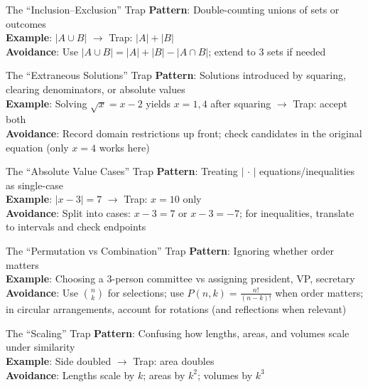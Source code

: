 \documentclass{article}
\begin{document}
\begin{trapbox}{The ``Inclusion--Exclusion'' Trap}
\textbf{Pattern}: Double-counting unions of sets or outcomes\\
\textbf{Example}: $|A\cup B|$ $\rightarrow$ Trap: $|A|+|B|$\\
\textbf{Avoidance}: Use $|A\cup B|=|A|+|B|-|A\cap B|$; extend to 3 sets if needed
\end{trapbox}

\begin{trapbox}{The ``Extraneous Solutions'' Trap}
\textbf{Pattern}: Solutions introduced by squaring, clearing denominators, or absolute values\\
\textbf{Example}: Solving $\sqrt{x}=x-2$ yields $x=1,4$ after squaring $\rightarrow$ Trap: accept both\\
\textbf{Avoidance}: Record domain restrictions up front; check candidates in the original equation (only $x=4$ works here)
\end{trapbox}

\begin{trapbox}{The ``Absolute Value Cases'' Trap}
\textbf{Pattern}: Treating $|\,\cdot\,|$ equations/inequalities as single-case\\
\textbf{Example}: $|x-3|=7$ $\rightarrow$ Trap: $x=10$ only\\
\textbf{Avoidance}: Split into cases: $x-3=7$ or $x-3=-7$; for inequalities, translate to intervals and check endpoints
\end{trapbox}

\begin{trapbox}{The ``Permutation vs Combination'' Trap}
\textbf{Pattern}: Ignoring whether order matters\\
\textbf{Example}: Choosing a 3-person committee vs assigning president, VP, secretary\\
\textbf{Avoidance}: Use $\binom{n}{k}$ for selections; use $P(n,k)=\frac{n!}{(n-k)!}$ when order matters; in circular arrangements, account for rotations (and reflections when relevant)
\end{trapbox}

\begin{trapbox}{The ``Scaling'' Trap}
\textbf{Pattern}: Confusing how lengths, areas, and volumes scale under similarity\\
\textbf{Example}: Side doubled $\rightarrow$ Trap: area doubles\\
\textbf{Avoidance}: Lengths scale by $k$; areas by $k^2$; volumes by $k^3$
\end{trapbox}
\end{document}
